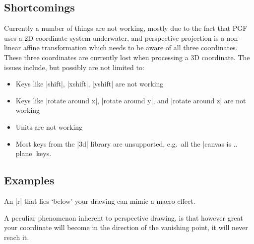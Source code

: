 \subsection{Shortcomings}

Currently a number of things are not working, mostly due to the fact that PGF
uses a 2D coordinate system underwater, and perspective projection is a
non-linear affine transformation which needs to be aware of all three
coordinates. These three coordinates are currently lost when processing a 3D
coordinate.
The issues include, but possibly are not limited to:
%
\begin{itemize}
    \item Keys like |shift|, |xshift|, |yshift| are not working
    \item Keys like |rotate around x|, |rotate around y|, and |rotate around z|
      are not working
    \item Units are not working
    \item Most keys from the |3d| library are unsupported, e.g.\ all the
      |canvas is .. plane| keys.
\end{itemize}


\subsection{Examples}

An |r| that lies `below' your drawing can mimic a macro effect.
%
\nopagebreak
\begin{codeexample}[preamble={\usetikzlibrary{perspective}}]
\end{codeexample}

A peculiar phenomenon inherent to perspective drawing, is that however great
your coordinate will become in the direction of the vanishing point, it will
never reach it.
%
\nopagebreak
\begin{codeexample}[preamble={\usetikzlibrary{perspective}}]
\end{codeexample}

